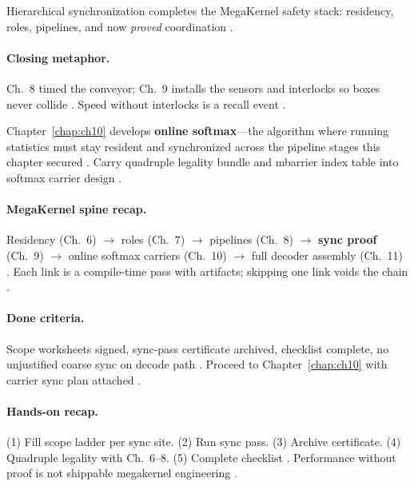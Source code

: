 Hierarchical synchronization completes the MegaKernel safety stack: residency, roles, pipelines, and now \emph{proved} coordination \citep{yirage2026,shah2024flashattention3,dao2022flashattention,mpk2025,wu2024mirage}.

\paragraph{Closing metaphor.}
Ch.~8 timed the conveyor; Ch.~9 installs the sensors and interlocks so boxes never collide \citep{semianalysis2024tma,shah2024flashattention3,dao2022flashattention}.
Speed without interlocks is a recall event \citep{taxbreak2026,patel2025llminference,memoryfloor2026}.

Chapter~\ref{chap:ch10} develops \textbf{online softmax}---the algorithm where running statistics must stay resident and synchronized across the pipeline stages this chapter secured \citep{dao2022flashattention,shah2024flashattention3,memoryfloor2026}.
Carry quadruple legality bundle and mbarrier index table into softmax carrier design \citep{yirage2026,chen2020compilerbasedhardw,semianalysis2024tma}.

\paragraph{MegaKernel spine recap.}
Residency (Ch.~6) $\rightarrow$ roles (Ch.~7) $\rightarrow$ pipelines (Ch.~8) $\rightarrow$ \textbf{sync proof} (Ch.~9) $\rightarrow$ online softmax carriers (Ch.~10) $\rightarrow$ full decoder assembly (Ch.~11) \citep{dao2022flashattention,mpk2025,yirage2026,shah2024flashattention3}.
Each link is a compile-time pass with artifacts; skipping one link voids the chain \citep{wu2024mirage,chen2020compilerbasedhardw,taxbreak2026}.

\paragraph{Done criteria.}
Scope worksheets signed, sync-pass certificate archived, checklist complete, no unjustified coarse sync on decode path \citep{yirage2026,shah2024flashattention3,patel2025llminference,taxbreak2026,chen2020compilerbasedhardw}.
Proceed to Chapter~\ref{chap:ch10} with carrier sync plan attached \citep{dao2022flashattention,semianalysis2024tma}.

\paragraph{Hands-on recap.}
(1) Fill scope ladder per sync site. (2) Run sync pass. (3) Archive certificate. (4) Quadruple legality with Ch.~6--8. (5) Complete checklist \citep{taxbreak2026,shah2024flashattention3,yirage2026,patel2025llminference,mpk2025}.
Performance without proof is not shippable megakernel engineering \citep{wu2024mirage,yirage2026,mpk2025}.

